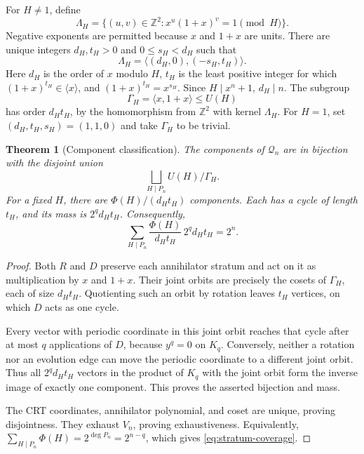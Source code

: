\documentclass[11pt]{article}
\newtheorem{theorem}{Theorem}[section]
\theoremstyle{definition}
\theoremstyle{remark}
\numberwithin{equation}{section}
\newcommand{\Z}{\mathbb Z}
\newcommand{\Q}{\mathcal Q}
\newcommand{\phip}{\Phi}
\begin{document}
For $H\ne1$, define
\begin{equation}\label{eq:lattice}
 \Lambda_H=\{(u,v)\in\Z^2:x^u(1+x)^v=1\pmod H\}.
\end{equation}
Negative exponents are permitted because $x$ and $1+x$ are units.
There are unique integers $d_H,t_H>0$ and $0\le s_H<d_H$ such that
\begin{equation}\label{eq:lattice-basis}
 \Lambda_H=\langle(d_H,0),(-s_H,t_H)\rangle.
\end{equation}
Here $d_H$ is the order of $x$ modulo $H$, $t_H$ is the least positive
integer for which $(1+x)^{t_H}\in\langle x\rangle$, and
$(1+x)^{t_H}=x^{s_H}$. Since $H\mid x^n+1$, $d_H\mid n$.
The subgroup
\[
 \Gamma_H=\langle x,1+x\rangle\le U(H)
\]
has order $d_Ht_H$, by the homomorphism from $\Z^2$ with kernel
$\Lambda_H$. For $H=1$, set $(d_H,t_H,s_H)=(1,1,0)$ and take
$\Gamma_H$ to be trivial.

\begin{theorem}[Component classification]\label{thm:classification}
The components of $\Q_n$ are in bijection with the disjoint union
\begin{equation}\label{eq:coset-partition}
 \bigsqcup_{H\mid P_n} U(H)/\Gamma_H.
\end{equation}
For a fixed $H$, there are $\phip(H)/(d_Ht_H)$ components. Each has a
cycle of length $t_H$, and its mass is $2^q d_Ht_H$.
Consequently,
\begin{equation}\label{eq:stratum-coverage}
 \sum_{H\mid P_n}\frac{\phip(H)}{d_Ht_H}\,2^q d_Ht_H=2^n.
\end{equation}
\end{theorem}

\begin{proof}
Both $R$ and $D$ preserve each annihilator stratum and act on it as
multiplication by $x$ and $1+x$. Their joint orbits are precisely the
cosets of $\Gamma_H$, each of size $d_Ht_H$. Quotienting such an orbit by
rotation leaves $t_H$ vertices, on which $D$ acts as one cycle.

Every vector with periodic coordinate in this joint orbit reaches that
cycle after at most $q$ applications of $D$, because $y^q=0$ on $K_q$.
Conversely, neither a rotation nor an evolution edge can move the periodic
coordinate to a different joint orbit. Thus all $2^q d_Ht_H$ vectors in
the product of $K_q$ with the joint orbit form the inverse image of exactly
one component. This proves the asserted bijection and mass.

The CRT coordinates, annihilator polynomial, and coset are unique, proving
disjointness. They exhaust $V_n$, proving exhaustiveness. Equivalently,
$\sum_{H\mid P_n}\phip(H)=2^{\deg P_n}=2^{n-q}$, which gives
\eqref{eq:stratum-coverage}.
\end{proof}
\end{document}

